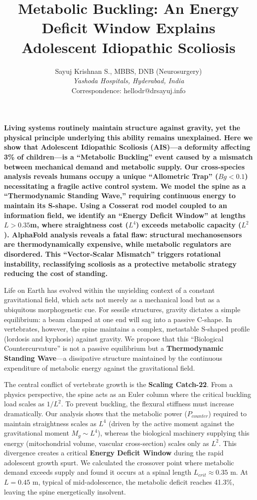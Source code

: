 \documentclass[11pt]{article}
\title{Metabolic Buckling: An Energy Deficit Window Explains Adolescent Idiopathic Scoliosis}
\author{Sayuj Krishnan S., MBBS, DNB (Neurosurgery) \\
\textit{Yashoda Hospitals, Hyderabad, India} \\
Correspondence: hellodr@drsayuj.info}
\date{}
\begin{document}
\linenumbers

\maketitle

\textbf{Living systems routinely maintain structure against gravity, yet the physical principle underlying this ability remains unexplained. Here we show that Adolescent Idiopathic Scoliosis (AIS)---a deformity affecting 3\% of children---is a ``Metabolic Buckling'' event caused by a mismatch between mechanical demand and metabolic supply. Our cross-species analysis reveals humans occupy a unique ``Allometric Trap'' ($Bg < 0.1$) necessitating a fragile active control system. We model the spine as a ``Thermodynamic Standing Wave,'' requiring continuous energy to maintain its S-shape. Using a Cosserat rod model coupled to an information field, we identify an ``Energy Deficit Window'' at lengths $L > 0.35$m, where straightness cost ($L^4$) exceeds metabolic capacity ($L^2$). AlphaFold analysis reveals a fatal flaw: structural mechanosensors are thermodynamically expensive, while metabolic regulators are disordered. This ``Vector-Scalar Mismatch'' triggers rotational instability, reclassifying scoliosis as a protective metabolic strategy reducing the cost of standing.}

\vspace{1em}

Life on Earth has evolved within the unyielding context of a constant gravitational field, which acts not merely as a mechanical load but as a ubiquitous morphogenetic cue\cite{thompson1917}. For sessile structures, gravity dictates a simple equilibrium: a beam clamped at one end will sag into a passive C-shape. In vertebrates, however, the spine maintains a complex, metastable S-shaped profile (lordosis and kyphosis) against gravity\cite{latimer2005}. We propose that this ``Biological Countercurvature'' is not a passive equilibrium but a \textbf{Thermodynamic Standing Wave}---a dissipative structure maintained by the continuous expenditure of metabolic energy against the gravitational field.

The central conflict of vertebrate growth is the \textbf{Scaling Catch-22}. From a physics perspective, the spine acts as an Euler column where the critical buckling load scales as $1/L^2$. To prevent buckling, the flexural stiffness must increase dramatically. Our analysis shows that the metabolic power ($P_{counter}$) required to maintain straightness scales as $L^4$ (driven by the active moment against the gravitational moment $M_g \sim L^4$), whereas the biological machinery supplying this energy (mitochondrial volume, vascular cross-section) scales only as $L^2$\cite{west1997,rolfe1997}. This divergence creates a critical \textbf{Energy Deficit Window} during the rapid adolescent growth spurt. We calculated the crossover point where metabolic demand exceeds supply and found it occurs at a spinal length $L_{crit} \approx 0.35$ m. At $L=0.45$ m, typical of mid-adolescence, the metabolic deficit reaches 41.3\%, leaving the spine energetically insolvent.
\end{document}
